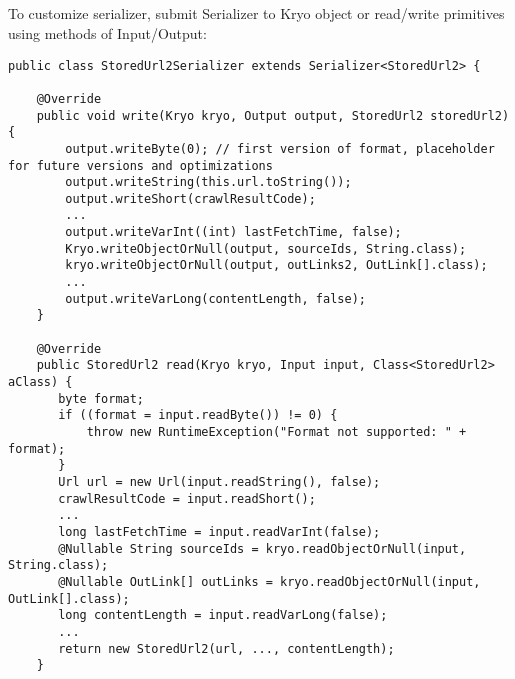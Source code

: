 \documentclass[8pt]{beamer}
\begin{document}
\subsection{\partname}
\begin{frame}[fragile]{\partname}

To customize serializer, submit Serializer to Kryo object or
read/write primitives using methods of Input/Output:

 \begin{verbatim}
public class StoredUrl2Serializer extends Serializer<StoredUrl2> {

    @Override
    public void write(Kryo kryo, Output output, StoredUrl2 storedUrl2) {
        output.writeByte(0); // first version of format, placeholder for future versions and optimizations
        output.writeString(this.url.toString());
        output.writeShort(crawlResultCode);
        ...
        output.writeVarInt((int) lastFetchTime, false);
        Kryo.writeObjectOrNull(output, sourceIds, String.class);
        kryo.writeObjectOrNull(output, outLinks2, OutLink[].class);
        ...
        output.writeVarLong(contentLength, false);
    }

    @Override
    public StoredUrl2 read(Kryo kryo, Input input, Class<StoredUrl2> aClass) {
       byte format;
       if ((format = input.readByte()) != 0) {
           throw new RuntimeException("Format not supported: " + format);
       }
       Url url = new Url(input.readString(), false);
       crawlResultCode = input.readShort();
       ...
       long lastFetchTime = input.readVarInt(false);
       @Nullable String sourceIds = kryo.readObjectOrNull(input, String.class);
       @Nullable OutLink[] outLinks = kryo.readObjectOrNull(input, OutLink[].class);
       long contentLength = input.readVarLong(false);
       ...
       return new StoredUrl2(url, ..., contentLength);
    }
 \end{verbatim}

\end{frame}


\renewcommand{\partname}{Standard vs Kryo}
\end{document}
